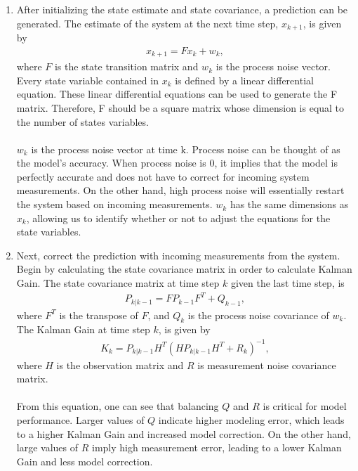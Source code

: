 \begin{enumerate}
     \item After initializing the state estimate and state covariance, a prediction can be generated. The estimate of the system at the next time step, $x_{k+1}$,  is given by
  \begin{align*}
      x_{k+1} = F x_{k} + w_{k} ,
  \end{align*} 
  where $F$ is the state transition matrix and $w_k$ is the process noise vector. Every state variable contained in $x_k$ is defined by a linear differential equation. These linear differential equations can be used to generate the F matrix. Therefore, F should be a square matrix whose dimension is equal to the number of states variables. \\ \\
  $w_k$ is the process noise vector at time k. Process noise can be thought of as the model's accuracy. When process noise is 0, it implies that the model is perfectly accurate and does not have to correct for incoming system measurements. On the other hand, high process noise will essentially restart the system based on incoming measurements. $w_k$ has the same dimensions as $x_k$, allowing us to identify whether or not to adjust the equations for the state variables. 
  
  \item Next, correct the prediction with incoming measurements from the system. Begin by calculating the state covariance matrix in order to calculate Kalman Gain. The state covariance matrix at time step $k$ given the last time step, is 
    \begin{align*} 
        P_{k | k -1} = F P_{k - 1} F^T + Q_{k-1}, 
    \end{align*}
    where $F^T$ is the transpose of $F$, and $Q_{k}$ is the process noise covariance of $w_k$.
    The Kalman Gain at time step $k$, is given by
    \begin{align*} 
        K_k = P_{k | k - 1} H^T (H P_{k | k - 1} H^T + R_k)^{-1},
    \end{align*}
      where $H$ is the observation matrix and $R$ is measurement noise covariance matrix. \\ \\

     \noindent From this equation, one can see that balancing $Q$ and $R$ is critical for model performance. Larger values of $Q$ indicate higher modeling error, which leads to a higher Kalman Gain and increased model correction. On the other hand, large values of $R$ imply high measurement error, leading to a lower Kalman Gain and less model correction. \\ \\
     

\end{enumerate}
